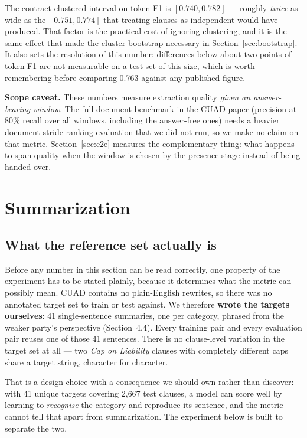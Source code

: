 The contract-clustered interval on token-F1 is $[0.740, 0.782]$ --- roughly \emph{twice} as wide as the $[0.751, 0.774]$ that treating clauses as independent would have produced. That factor is the practical cost of ignoring clustering, and it is the same effect that made the cluster bootstrap necessary in Section~\ref{sec:bootstrap}. It also sets the resolution of this number: differences below about two points of token-F1 are not measurable on a test set of this size, which is worth remembering before comparing 0.763 against any published figure.

\textbf{Scope caveat.} These numbers measure extraction quality \emph{given an answer-bearing window}. The full-document benchmark in the CUAD paper (precision at 80\% recall over all windows, including the answer-free ones) needs a heavier document-stride ranking evaluation that we did not run, so we make no claim on that metric. Section~\ref{sec:e2e} measures the complementary thing: what happens to span quality when the window is chosen by the presence stage instead of being handed over.

\section{Summarization}
\label{sec:summ}

\subsection{What the reference set actually is}
Before any number in this section can be read correctly, one property of the experiment has to be stated plainly, because it determines what the metric can possibly mean. CUAD contains no plain-English rewrites, so there was no annotated target set to train or test against. We therefore \textbf{wrote the targets ourselves}: 41 single-sentence summaries, one per category, phrased from the weaker party's perspective (Section~4.4). Every training pair and every evaluation pair reuses one of those 41 sentences. There is no clause-level variation in the target set at all --- two \emph{Cap on Liability} clauses with completely different caps share a target string, character for character.

That is a design choice with a consequence we should own rather than discover: with 41 unique targets covering 2{,}667 test clauses, a model can score well by learning to \emph{recognise} the category and reproduce its sentence, and the metric cannot tell that apart from summarization. The experiment below is built to separate the two.

